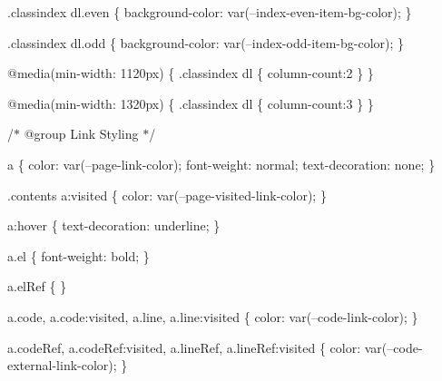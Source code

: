 .classindex dl.\+even \{ background-\/color\+: var(--index-\/even-\/item-\/bg-\/color); \}

.classindex dl.\+odd \{ background-\/color\+: var(--index-\/odd-\/item-\/bg-\/color); \}

@media(min-\/width\+: 1120px) \{ .classindex dl \{ column-\/count\+:2 \} \}

@media(min-\/width\+: 1320px) \{ .classindex dl \{ column-\/count\+:3 \} \}

/\texorpdfstring{$\ast$}{*} @group Link Styling \texorpdfstring{$\ast$}{*}/

a \{ color\+: var(--page-\/link-\/color); font-\/weight\+: normal; text-\/decoration\+: none; \}

.contents a\+:visited \{ color\+: var(--page-\/visited-\/link-\/color); \}

a\+:hover \{ text-\/decoration\+: underline; \}

a.\+el \{ font-\/weight\+: bold; \}

a.\+el\+Ref \{ \}

a.\+code, a.\+code\+:visited, a.\+line, a.\+line\+:visited \{ color\+: var(--code-\/link-\/color); \}

a.\+code\+Ref, a.\+code\+Ref\+:visited, a.\+line\+Ref, a.\+line\+Ref\+:visited \{ color\+: var(--code-\/external-\/link-\/color); \}

